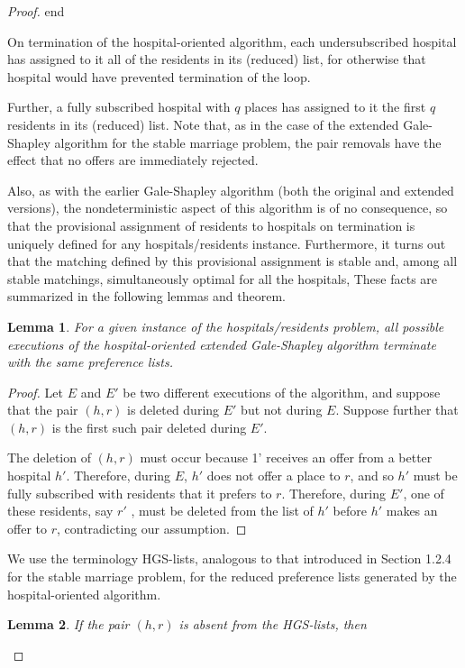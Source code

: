 \documentclass[14pt]{extarticle}
\newtheorem{lemma}{Lemma}
\begin{document}
\begin{proof}
end

On termination of the hospital-oriented algorithm, each undersubscribed hospital has assigned to it all of the residents in its (reduced) list, for otherwise that hospital would have prevented termination of the loop. 

Further, a fully subscribed hospital with $q$ places has assigned to it the first $q$ residents in its (reduced) list. Note that, as in the case of the extended Gale-Shapley algorithm for the stable marriage problem, the pair removals have the effect that no offers are immediately rejected.

Also, as with the earlier Gale-Shapley algorithm (both the original and extended versions), the nondeterministic aspect of this algorithm is of no consequence, so that the provisional assignment of residents to hospitals on termination is uniquely defined for any hospitals/residents instance. Furthermore, it turns out that the matching defined by this provisional assignment is stable and, among all stable matchings, simultaneously optimal for all the hospitals, These facts are summarized in the following lemmas and
theorem.

\begin{lemma} For a given instance of the hospitals/residents problem, all possible executions of the hospital-oriented extended Gale-Shapley algorithm terminate with the same preference lists.
\end{lemma}
\begin{proof}
Let $E$ and $E'$ be two different executions of the algorithm, and
suppose that the pair $(h, r)$ is deleted during $E'$ but not during $E$. Suppose further that $(h,r)$ is the first such pair deleted during $E'$.

The deletion of $(h, r)$ must occur because 1' receives an offer from a better hospital $h'$. Therefore, during $E$, $h'$ does not offer a place to $r$, and so $h'$ must be fully subscribed with residents that it prefers to $r$. Therefore, during $E'$, one of these residents, say $r'$ , must be deleted from the list of $h'$ before $h'$ makes an offer to $r$, contradicting our assumption.
\end{proof}

We use the terminology HGS-lists, analogous to that introduced in Section 1.2.4 for the stable marriage problem, for the reduced preference lists generated by the hospital-oriented algorithm.

\begin{lemma} If the pair $(h,r)$ is absent from the HGS-lists, then


\end{lemma}
\end{proof}
\end{document}
